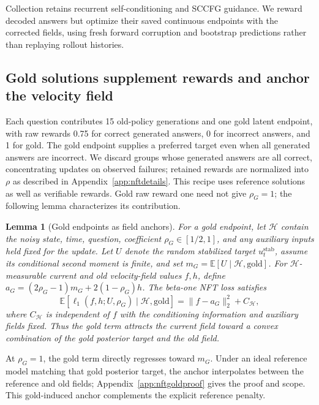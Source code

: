 \documentclass[11pt,letterpaper]{article}
\newcommand{\E}{\mathbb{E}}
\newtheorem{lemma}{Lemma}
\begin{document}
Collection retains recurrent self-conditioning and SCCFG guidance. We reward decoded answers but optimize their saved continuous endpoints with the corrected fields, using fresh forward corruption and bootstrap predictions rather than replaying rollout histories.

\subsection{Gold solutions supplement rewards and anchor the velocity field}
\label{sec:nftgold}

Each question contributes 15 old-policy generations and one gold latent endpoint, with raw rewards 0.75 for correct generated answers, 0 for incorrect answers, and 1 for gold. The gold endpoint supplies a preferred target even when all generated answers are incorrect. We discard groups whose generated answers are all correct, concentrating updates on observed failures; retained rewards are normalized into $\rho$ as described in Appendix~\ref{app:nftdetails}. This recipe uses reference solutions as well as verifiable rewards. Gold raw reward one need not give $\rho_G=1$; the following lemma characterizes its contribution.

\begin{lemma}[Gold endpoints as field anchors]
\label{lem:goldanchor}
For a gold endpoint, let $\mathcal H$ contain the noisy state, time, question, coefficient $\rho_G\in[1/2,1]$, and any auxiliary inputs held fixed for the update. Let $U$ denote the random stabilized target $u_t^{\mathrm{stab}}$, assume its conditional second moment is finite, and set $m_G=\E[U\mid\mathcal H,\mathrm{gold}]$. For $\mathcal H$-measurable current and old velocity-field values $f,h$, define $a_G=(2\rho_G-1)m_G+2(1-\rho_G)h$. The beta-one NFT loss satisfies
\begin{equation}
 \E[\ell_1(f,h;U,\rho_G)\mid\mathcal H,\mathrm{gold}]
 =\|f-a_G\|_2^2+C_{\mathcal H},
\label{eq:nftgoldanchor}
\end{equation}
where $C_{\mathcal H}$ is independent of $f$ with the conditioning information and auxiliary fields fixed. Thus the gold term attracts the current field toward a convex combination of the gold posterior target and the old field.
\end{lemma}

At $\rho_G=1$, the gold term directly regresses toward $m_G$. Under an ideal reference model matching that gold posterior target, the anchor interpolates between the reference and old fields; Appendix~\ref{app:nftgoldproof} gives the proof and scope. This gold-induced anchor complements the explicit reference penalty.
\end{document}
